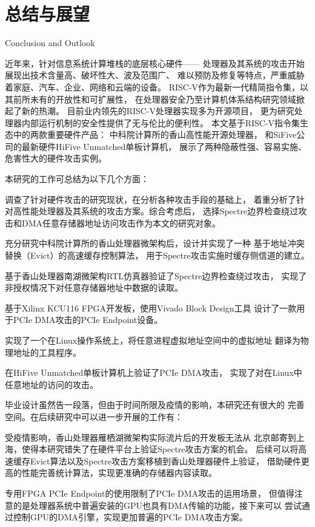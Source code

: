 
\chapter{总结与展望}{Conclusion and Outlook}

近年来，针对信息系统计算堆栈的底层核心硬件——
处理器及其系统的攻击开始展现出技术含量高、破坏性大、波及范围广、
难以预防及修复等特点，严重威胁着家庭、汽车、企业、网络和云端的设备。
RISC-V作为最新一代精简指令集，以其前所未有的开放性和可扩展性，
在处理器安全乃至计算机体系结构研究领域掀起了新的热潮。
目前业内领先的RISC-V处理器实现多为开源项目，
更为研究处理器内部运行机制的安全性提供了无与伦比的便利性。
本文基于RISC-V指令集生态中的两款重要硬件产品：
中科院计算所的香山高性能开源处理器，
和SiFive公司的最新硬件HiFive Unmatched单板计算机，
展示了两种隐蔽性强、容易实施、危害性大的硬件攻击实例。

本研究的工作可总结为以下几个方面：

\begin{compactenum}
	\item 调查了针对硬件攻击的研究现状，在分析各种攻击手段的基础上，
    着重分析了针对高性能处理器及其系统的攻击方案。综合考虑后，
    选择Spectre边界检查绕过攻击和DMA任意存储器地址访问攻击作为本文的研究对象。
	\item 充分研究中科院计算所的香山处理器微架构后，设计并实现了一种
    基于地址冲突替换（Evict）的高速缓存控制算法，
    用于Spectre攻击实施时缓存侧信道的建立。
	\item 基于香山处理器南湖微架构RTL仿真器验证了Spectre边界检查绕过攻击，
    实现了非授权情况下对任意存储器地址中数据的读取。
	\item 基于Xilinx KCU116 FPGA开发板，使用Vivado Block Design工具
    设计了一款用于PCIe DMA攻击的PCIe Endpoint设备。
	\item 实现了一个在Linux操作系统上，将任意进程虚拟地址空间中的虚拟地址
    翻译为物理地址的工具程序。
    \item 在HiFive Unmatched单板计算机上验证了PCIe DMA攻击，
    实现了对在Linux中任意地址的访问的攻击。
\end{compactenum}

毕业设计虽然告一段落，但由于时间所限及疫情的影响，本研究还有很大的
完善空间。在后续研究中可以进一步开展的工作有：

\begin{compactenum}
	\item 受疫情影响，香山处理器雁栖湖微架构实际流片后的开发板无法从
    北京邮寄到上海，使得本研究错失了在硬件平台上验证Spectre攻击方案的机会。
    后续可以将高速缓存Evict算法以及Spectre攻击方案移植到香山处理器硬件上验证，
    借助硬件更高的性能完善统计算法，实现更准确的存储器内容读取。
	\item 专用FPGA PCIe Endpoint的使用限制了PCIe DMA攻击的运用场景，
    但值得注意的是处理器系统中普遍安装的GPU也具有DMA传输的功能，接下来可以
    尝试通过控制GPU的DMA引擎，实现更加普遍的PCIe DMA攻击方案。
\end{compactenum}

\newpage
